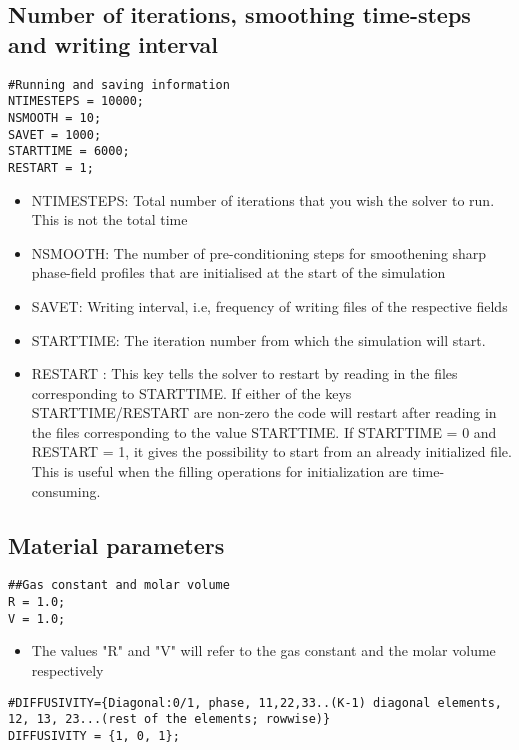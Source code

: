 \documentclass[a4paper,10pt]{article}
\begin{document}
\subsection{Number of iterations, smoothing time-steps and writing interval}

\begin{lstlisting}
#Running and saving information
NTIMESTEPS = 10000;
NSMOOTH = 10;
SAVET = 1000;
STARTTIME = 6000;
RESTART = 1;
\end{lstlisting}

\begin{itemize}
 \item NTIMESTEPS: Total number of iterations that you wish the solver to run. This is not the total time
 \item NSMOOTH: The number of pre-conditioning steps for smoothening sharp phase-field profiles that are initialised at the start of the simulation
 \item SAVET: Writing interval, i.e, frequency of writing files of the respective fields
 \item STARTTIME: The iteration number from which the simulation will start.
 \item RESTART : This key tells the solver to restart by reading in the files corresponding to STARTTIME. If either of the keys STARTTIME/RESTART are non-zero
 the code will restart after reading in the files corresponding to the value STARTTIME. If STARTTIME = 0 and RESTART = 1, it gives the possibility to start from 
 an already initialized file. This is useful when the filling operations for initialization are time-consuming.
\end{itemize}

\subsection{Material parameters}

\begin{lstlisting}
##Gas constant and molar volume
R = 1.0;
V = 1.0;
\end{lstlisting}

\begin{itemize}
 \item The values "R" and "V" will refer to the gas constant and the molar volume respectively 
\end{itemize}

\begin{lstlisting}
#DIFFUSIVITY={Diagonal:0/1, phase, 11,22,33..(K-1) diagonal elements, 12, 13, 23...(rest of the elements; rowwise)}
DIFFUSIVITY = {1, 0, 1};
\end{lstlisting}
\end{document}
